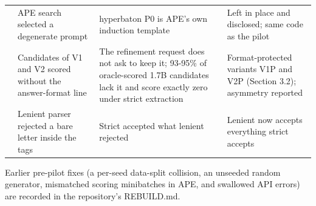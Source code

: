 \documentclass{ieeeaccess}
\begin{document}
\begin{table}[htbp]
\begin{tabular}{>{\raggedright\arraybackslash}p{}>{\raggedright\arraybackslash}p{}>{\raggedright\arraybackslash}p{}>{\raggedright\arraybackslash}p{}}
11 & APE search selected a degenerate prompt & hyperbaton P0 is APE's own induction template & Left in place and disclosed; same code as the pilot \\
12 & Candidates of V1 and V2 scored without the answer-format line & The refinement request does not ask to keep it; 93-95\% of oracle-scored 1.7B candidates lack it and score exactly zero under strict extraction & Format-protected variants V1P and V2P (Section 3.2); asymmetry reported \\
13 & Lenient parser rejected a bare letter inside the tags & Strict accepted what lenient rejected & Lenient now accepts everything strict accepts \\
\bottomrule
\end{tabular}
\end{table}

Earlier pre-pilot fixes (a per-seed data-split collision, an unseeded random generator, mismatched scoring minibatches in APE, and swallowed API errors) are recorded in the repository's REBUILD.md.
\end{document}
